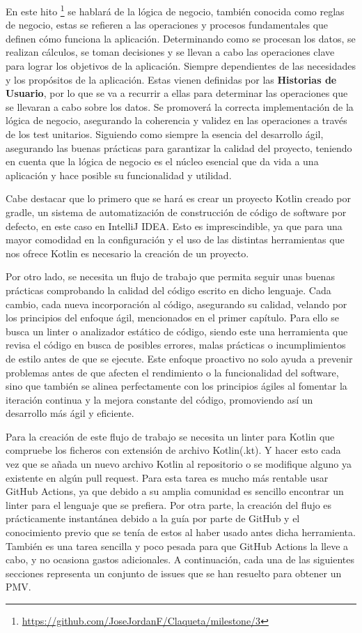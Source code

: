 En este hito \footnote{\url{https://github.com/JoseJordanF/Claqueta/milestone/3}} se hablará de la 
lógica de negocio, también conocida como reglas de negocio, estas se refieren a las operaciones y procesos 
fundamentales que definen cómo funciona la aplicación. Determinando como se procesan los datos, se 
realizan cálculos, se toman decisiones y se llevan a cabo las operaciones clave para lograr los 
objetivos de la aplicación. Siempre dependientes de las necesidades y los propósitos de la aplicación. 
Estas vienen definidas por las \textbf{Historias de Usuario}, por lo que se va a recurrir a ellas para 
determinar las operaciones que se llevaran a cabo sobre los datos. Se promoverá la correcta 
implementación de la lógica de negocio, asegurando la coherencia y validez en las operaciones a través 
de los test unitarios. Siguiendo como siempre la esencia del desarrollo ágil, asegurando las
buenas prácticas para garantizar la calidad del proyecto, teniendo en cuenta que la lógica de negocio es 
el núcleo esencial que da vida a una aplicación y hace posible su funcionalidad y utilidad. 

Cabe destacar que lo primero que se hará es crear un proyecto Kotlin creado por gradle, un sistema de 
automatización de construcción de código de software por defecto, en este caso en IntelliJ IDEA. Esto 
es imprescindible, ya que para una mayor comodidad en la configuración y el uso de las distintas 
herramientas que nos ofrece Kotlin es necesario la creación de un proyecto.

Por otro lado, se necesita un flujo de trabajo que permita seguir unas buenas prácticas comprobando
la calidad del código escrito en dicho lenguaje. Cada cambio, cada nueva incorporación al código, asegurando
su calidad, velando por los principios del enfoque ágil, mencionados en el primer capítulo. Para ello se busca un 
linter o analizador estático de código, siendo este una herramienta que revisa el código en busca de posibles 
errores, malas prácticas o incumplimientos de estilo antes de que se ejecute. Este enfoque proactivo no solo 
ayuda a prevenir problemas antes de que afecten el rendimiento o la funcionalidad del software, sino que 
también se alinea perfectamente con los principios ágiles al fomentar la iteración continua y la mejora 
constante del código, promoviendo así un desarrollo más ágil y eficiente. 

Para la creación de este flujo de trabajo se necesita un linter para Kotlin que compruebe los ficheros con 
extensión de archivo Kotlin(.kt). Y hacer esto cada vez que se añada un nuevo archivo Kotlin al repositorio 
o se modifique alguno ya existente en algún pull request. Para esta tarea es mucho más rentable usar GitHub 
Actions, ya que debido a su amplia comunidad es sencillo encontrar un linter para el lenguaje que se prefiera. 
Por otra parte, la creación del flujo es prácticamente instantánea debido a la guía por parte de GitHub y el conocimiento previo que se tenía de estos al haber usado antes dicha herramienta. 
También es una tarea sencilla y poco pesada para que GitHub Actions la lleve a cabo, y no ocasiona gastos 
adicionales.
A continuación, cada una de las siguientes secciones representa un conjunto de issues que se han resuelto para obtener 
un PMV.

